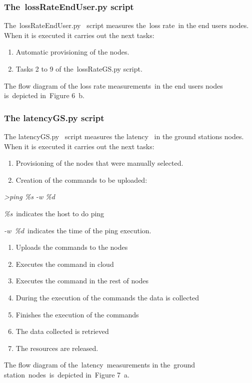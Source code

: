 \documentclass[a4paper]{article}
\newcounter{saveenum}
\newcommand\liststyleLFOxi{%
\renewcommand\theenumi{\arabic{enumi}}
\renewcommand\theenumii{\roman{enumii}}
\renewcommand\theenumiii{\arabic{enumiii}}
\renewcommand\labelenumi{\theenumi.}
\renewcommand\labelitemi{o}
\renewcommand\labelenumii{\theenumii.}
\renewcommand\labelenumiii{\theenumiii.}
}
\newcommand\liststyleLFOxii{%
\renewcommand\theenumi{\arabic{enumi}}
\renewcommand\theenumii{\roman{enumii}}
\renewcommand\theenumiii{\arabic{enumiii}}
\renewcommand\labelenumi{\theenumi.}
\renewcommand\labelitemi{o}
\renewcommand\labelenumii{\theenumii.}
\renewcommand\labelenumiii{\theenumiii.}
}
\begin{document}
\subsubsection[The\ lossRateEndUser.py script]{The\ lossRateEndUser.py
script}
The\ lossRateEndUser.py \ script measures the\ loss rate\ in the end
users nodes. When it is executed it carries out the next tasks:

\liststyleLFOxi
\setcounter{saveenum}{\value{enumi}}
\begin{enumerate}
\setcounter{enumi}{\value{saveenum}}
\item Automatic provisioning of the nodes.
\item Tasks 2 to 9 of the\ lossRateGS.py script.
\end{enumerate}
The flow diagram of the loss rate measurements\ in the end users nodes
is\ depicted in\ Figure 6\ b.\ 

\subsubsection{The latencyGS.py script}
The latencyGS.py \ script measures the latency \ in the ground stations
nodes. When it is executed it carries out the next tasks:

\liststyleLFOxii
\setcounter{saveenum}{\value{enumi}}
\begin{enumerate}
\setcounter{enumi}{\value{saveenum}}
\item Provisioning of the nodes that were manually selected.
\item Creation of the commands to be uploaded:
\end{enumerate}
{\itshape
{\textgreater}ping \%s -w \%d}

\textit{\%s}\ indicates the host to do ping

\textit{{}-w}\textit{\ \%d}\ indicates the time of the ping
execution.\textit{\ }

\liststyleLFOxii
\setcounter{saveenum}{\value{enumi}}
\begin{enumerate}
\setcounter{enumi}{\value{saveenum}}
\item Uploads the commands to the nodes
\item Executes the command in cloud
\item Executes the command in the rest of nodes
\item During the execution of the commands the data is collected
\item Finishes the execution of the commands\ 
\item The data collected is retrieved\ 
\item The resources are released.
\end{enumerate}
The flow diagram of the\ latency\ measurements in the\ ground
station\ nodes\ is\ depicted in\ Figure 7\ a.
\end{document}
